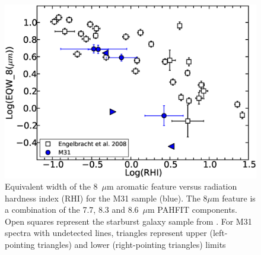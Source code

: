 \begin{figure}
\centering
\includegraphics[scale=0.25]{./englvsmy.eps}
\caption{Equivalent width of the 8~$\mu$m aromatic feature versus radiation hardness index (RHI) for the M31 sample (blue). 
The 8$\mu$m feature is a combination of the 7.7, 8.3 and 8.6~$\mu$m PAHFIT components. 
Open squares represent the starburst galaxy sample from \citet{Engelbracht_2008}. 
For M31 spectra with undetected lines, triangles represent upper (left-pointing triangles) and lower (right-pointing triangles) limits }
\label{englII}
\end{figure}

